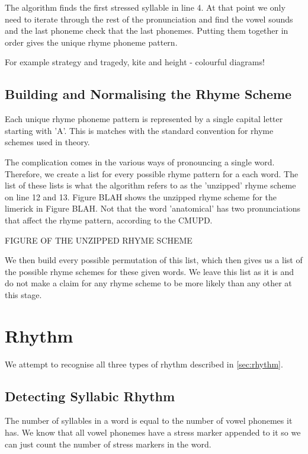 The algorithm finds the first stressed syllable in line 4. At that point we only need to iterate through the rest of the pronunciation and find the vowel sounds and the last phoneme check that the last phonemes. Putting them together in order gives the unique rhyme phoneme pattern. 

For example strategy and tragedy, kite and height - colourful diagrams!			

\subsection{Building and Normalising the Rhyme Scheme}

Each unique rhyme phoneme pattern is represented by a single capital letter starting with 'A'. This is matches with the standard convention for rhyme schemes used in theory. 

The complication comes in the various ways of pronouncing a single word. Therefore, we create a list for every possible rhyme pattern for a each word. The list of these lists is what the algorithm refers to as the 'unzipped' rhyme scheme on line 12 and 13. Figure BLAH shows the unzipped rhyme scheme for the limerick in Figure BLAH. Not that the word 'anatomical' has two pronunciations that affect the rhyme pattern, according to the CMUPD.

FIGURE OF THE UNZIPPED RHYME SCHEME

We then build every possible permutation of this list, which then gives us a list of the possible rhyme schemes for these given words. We leave this list as it is and do not make a claim for any rhyme scheme to be more likely than any other at this stage.

\section{Rhythm}

We attempt to recognise all three types of rhythm described in \ref{sec:rhythm}. 

\subsection{Detecting Syllabic Rhythm}

The number of syllables in a word is equal to the number of vowel phonemes it has. We know that all vowel phonemes have a stress marker appended to it so we can just count the number of stress markers in the word.

